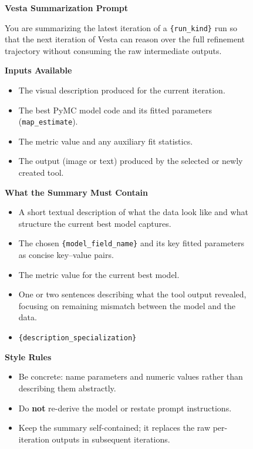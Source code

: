 \documentclass{article}
\newcommand{\method}{{\sc Vesta}}
\begin{document}
\begin{figure}[h]
\small
\begin{mdframed}[linecolor=gray!50, backgroundcolor=gray!5, linewidth=0.8pt]

\textbf{\method{} Summarization Prompt}

\medskip
You are summarizing the latest iteration of a \texttt{\{run\_kind\}} run so
that the next iteration of \method{} can reason over the full refinement
trajectory without consuming the raw intermediate outputs.

\medskip
\textbf{Inputs Available}
\begin{itemize}[leftmargin=*, nosep]
    \item The visual description produced for the current iteration.
    \item The best PyMC model code and its fitted parameters
          (\texttt{map\_estimate}).
    \item The metric value and any auxiliary fit statistics.
    \item The output (image or text) produced by the selected or newly
          created tool.
\end{itemize}

\medskip
\textbf{What the Summary Must Contain}
\begin{itemize}[leftmargin=*, nosep]
    \item A short textual description of what the data look like and what
          structure the current best model captures.
    \item The chosen \texttt{\{model\_field\_name\}} and its key fitted
          parameters as concise key--value pairs.
    \item The metric value for the current best model.
    \item One or two sentences describing what the tool output revealed,
          focusing on remaining mismatch between the model and the data.
    \item \texttt{\{description\_specialization\}}
\end{itemize}

\medskip
\textbf{Style Rules}
\begin{itemize}[leftmargin=*, nosep]
    \item Be concrete: name parameters and numeric values rather than
          describing them abstractly.
    \item Do \textbf{not} re-derive the model or restate prompt
          instructions.
    \item Keep the summary self-contained; it replaces the raw
          per-iteration outputs in subsequent iterations.
\end{itemize}


\end{mdframed}
\end{figure}
\end{document}
